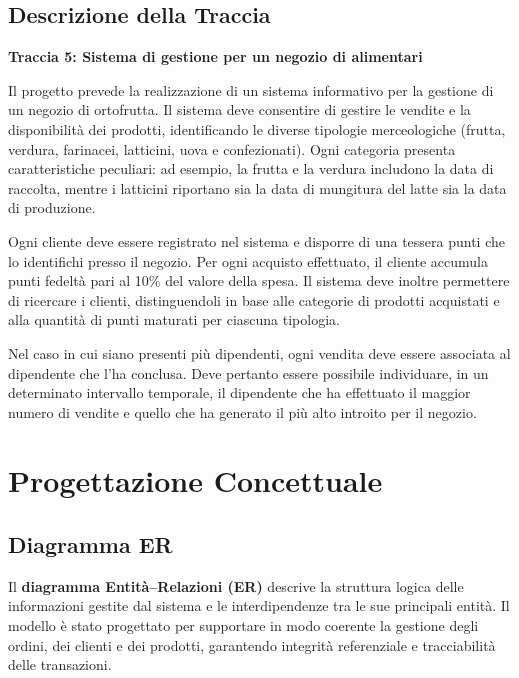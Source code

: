 \documentclass[a4paper,12pt]{article}
\begin{document}
\subsection{Descrizione della Traccia}

\textbf{Traccia 5: Sistema di gestione per un negozio di alimentari}

Il progetto prevede la realizzazione di un sistema informativo per la gestione di un negozio di ortofrutta.  
Il sistema deve consentire di gestire le vendite e la disponibilità dei prodotti, identificando le diverse tipologie merceologiche (frutta, verdura, farinacei, latticini, uova e confezionati). Ogni categoria presenta caratteristiche peculiari: ad esempio, la frutta e la verdura includono la data di raccolta, mentre i latticini riportano sia la data di mungitura del latte sia la data di produzione.

Ogni cliente deve essere registrato nel sistema e disporre di una tessera punti che lo identifichi presso il negozio. Per ogni acquisto effettuato, il cliente accumula punti fedeltà pari al 10\% del valore della spesa.  
Il sistema deve inoltre permettere di ricercare i clienti, distinguendoli in base alle categorie di prodotti acquistati e alla quantità di punti maturati per ciascuna tipologia.

Nel caso in cui siano presenti più dipendenti, ogni vendita deve essere associata al dipendente che l’ha conclusa. Deve pertanto essere possibile individuare, in un determinato intervallo temporale, il dipendente che ha effettuato il maggior numero di vendite e quello che ha generato il più alto introito per il negozio.

\newpage
\section{Progettazione Concettuale}

\subsection{Diagramma ER}
Il \textbf{diagramma Entità--Relazioni (ER)} descrive la struttura logica delle informazioni gestite dal sistema e le interdipendenze tra le sue principali entità. 
Il modello è stato progettato per supportare in modo coerente la gestione degli ordini, dei clienti e dei prodotti, garantendo integrità referenziale e tracciabilità delle transazioni.
\end{document}
